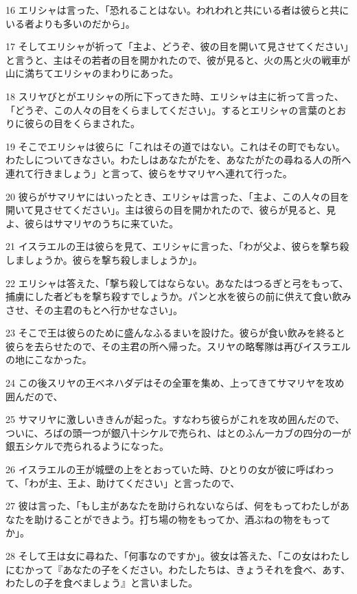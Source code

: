 \par 16 エリシャは言った、「恐れることはない。われわれと共にいる者は彼らと共にいる者よりも多いのだから」。
\par 17 そしてエリシャが祈って「主よ、どうぞ、彼の目を開いて見させてください」と言うと、主はその若者の目を開かれたので、彼が見ると、火の馬と火の戦車が山に満ちてエリシャのまわりにあった。
\par 18 スリヤびとがエリシャの所に下ってきた時、エリシャは主に祈って言った、「どうぞ、この人々の目をくらましてください」。するとエリシャの言葉のとおりに彼らの目をくらまされた。
\par 19 そこでエリシャは彼らに「これはその道ではない。これはその町でもない。わたしについてきなさい。わたしはあなたがたを、あなたがたの尋ねる人の所へ連れて行きましょう」と言って、彼らをサマリヤへ連れて行った。
\par 20 彼らがサマリヤにはいったとき、エリシャは言った、「主よ、この人々の目を開いて見させてください」。主は彼らの目を開かれたので、彼らが見ると、見よ、彼らはサマリヤのうちに来ていた。
\par 21 イスラエルの王は彼らを見て、エリシャに言った、「わが父よ、彼らを撃ち殺しましょうか。彼らを撃ち殺しましょうか」。
\par 22 エリシャは答えた、「撃ち殺してはならない。あなたはつるぎと弓をもって、捕虜にした者どもを撃ち殺すでしょうか。パンと水を彼らの前に供えて食い飲みさせ、その主君のもとへ行かせなさい」。
\par 23 そこで王は彼らのために盛んなふるまいを設けた。彼らが食い飲みを終ると彼らを去らせたので、その主君の所へ帰った。スリヤの略奪隊は再びイスラエルの地にこなかった。
\par 24 この後スリヤの王ベネハダデはその全軍を集め、上ってきてサマリヤを攻め囲んだので、
\par 25 サマリヤに激しいききんが起った。すなわち彼らがこれを攻め囲んだので、ついに、ろばの頭一つが銀八十シケルで売られ、はとのふん一カブの四分の一が銀五シケルで売られるようになった。
\par 26 イスラエルの王が城壁の上をとおっていた時、ひとりの女が彼に呼ばわって、「わが主、王よ、助けてください」と言ったので、
\par 27 彼は言った、「もし主があなたを助けられないならば、何をもってわたしがあなたを助けることができよう。打ち場の物をもってか、酒ぶねの物をもってか」。
\par 28 そして王は女に尋ねた、「何事なのですか」。彼女は答えた、「この女はわたしにむかって『あなたの子をください。わたしたちは、きょうそれを食べ、あす、わたしの子を食べましょう』と言いました。
